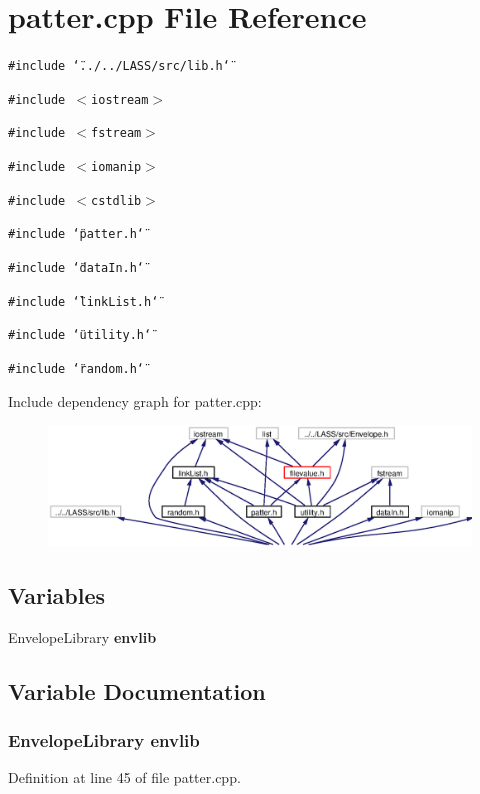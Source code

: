 \section{patter.cpp File Reference}
\label{patter_8cpp}
{\tt \#include \char`\"{}../../LASS/src/lib.h\char`\"{}}\par
{\tt \#include $<$iostream$>$}\par
{\tt \#include $<$fstream$>$}\par
{\tt \#include $<$iomanip$>$}\par
{\tt \#include $<$cstdlib$>$}\par
{\tt \#include \char`\"{}patter.h\char`\"{}}\par
{\tt \#include \char`\"{}data\-In.h\char`\"{}}\par
{\tt \#include \char`\"{}link\-List.h\char`\"{}}\par
{\tt \#include \char`\"{}utility.h\char`\"{}}\par
{\tt \#include \char`\"{}random.h\char`\"{}}\par


Include dependency graph for patter.cpp:\begin{figure}[H]
\begin{center}
\leavevmode
\includegraphics[width=318pt]{patter_8cpp__incl}
\end{center}
\end{figure}
\subsection*{Variables}
\begin{CompactItemize}
\item 
Envelope\-Library {\bf envlib}
\end{CompactItemize}


\subsection{Variable Documentation}
\subsubsection{\setlength{\rightskip}{0pt plus 5cm}Envelope\-Library {\bf envlib}}\label{patter_8cpp_a0}




Definition at line 45 of file patter.cpp.